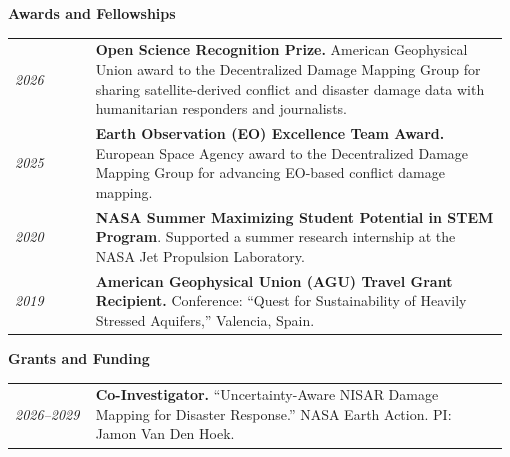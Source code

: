 \documentclass[letterpaper,11pt,oneside]{article}
\newcommand{\datefmt}[1]{\textit{#1}}
\begin{document}
\begin{flushleft}\textbf{\Large{Awards and Fellowships}}\end{flushleft}
\vspace{-4ex}
\begin{longtable}{@{}p{0.16\linewidth}p{0.82\linewidth}@{}}

\datefmt{2026} & \textbf{Open Science Recognition Prize.} American Geophysical Union award to the Decentralized Damage Mapping Group for sharing satellite-derived conflict and disaster damage data with humanitarian responders and journalists.\\[1.0ex]

\datefmt{2025} & \textbf{Earth Observation (EO) Excellence Team Award.} European Space Agency award to the Decentralized Damage Mapping Group for advancing EO-based conflict damage mapping.\\[1.0ex]

\datefmt{2020} & \textbf{NASA Summer Maximizing Student Potential in STEM Program}. Supported a summer research internship at the NASA Jet Propulsion Laboratory.\\[1.0ex]

\datefmt{2019} & \textbf{American Geophysical Union (AGU) Travel Grant Recipient.} Conference: “Quest for Sustainability of Heavily Stressed Aquifers,” Valencia, Spain.\\[1.0ex]

\end{longtable}
\vspace{-4ex}

\begin{flushleft}\textbf{\Large{Grants and Funding}}\end{flushleft}
\vspace{-4ex}
\begin{longtable}{@{}p{0.16\linewidth}p{0.82\linewidth}@{}}

\datefmt{2026–2029} & \textbf{Co-Investigator.} “Uncertainty-Aware NISAR Damage Mapping for Disaster Response.” NASA Earth Action. PI: Jamon Van Den Hoek.\\[1.0ex]

\end{longtable}
\vspace{-4ex}
\end{document}
